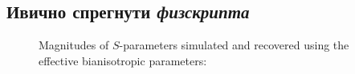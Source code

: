 \subsection{Ивично спрегнути \emph{физскрипта}}
\begin{figure}[!t]
\centering
{}
\caption{Magnitudes of $S$-parameters simulated and recovered using the effective bianisotropic parameters: }
\label{ph:fig8}
\end{figure} 

